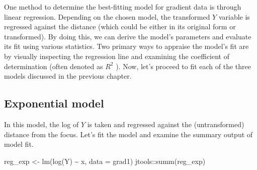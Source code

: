 \documentclass[
  letterpaper,
]{book}
\newenvironment{Shaded}{\begin{snugshade}}{\end{snugshade}}
\newcommand{\AttributeTok}[1]{\textcolor[rgb]{0.40,0.45,0.13}{#1}}
\newcommand{\FunctionTok}[1]{\textcolor[rgb]{0.28,0.35,0.67}{#1}}
\newcommand{\NormalTok}[1]{\textcolor[rgb]{0.00,0.23,0.31}{#1}}
\newcommand{\OtherTok}[1]{\textcolor[rgb]{0.00,0.23,0.31}{#1}}
\newcommand{\SpecialCharTok}[1]{\textcolor[rgb]{0.37,0.37,0.37}{#1}}
\begin{document}
One method to determine the best-fitting model for gradient data is
through linear regression. Depending on the chosen model, the
transformed \(Y\) variable is regressed against the distance (which
could be either in its original form or transformed). By doing this, we
can derive the model's parameters and evaluate its fit using various
statistics. Two primary ways to appraise the model's fit are by visually
inspecting the regression line and examining the coefficient of
determination (often denoted as \(R^2\) ). Now, let's proceed to fit
each of the three models discussed in the previous chapter.

\hypertarget{exponential-model-1}{%
\subsection{Exponential model}\label{exponential-model-1}}

In this model, the log of \(Y\) is taken and regressed against the
(untransformed) distance from the focus. Let's fit the model and examine
the summary output of model fit.

\begin{Shaded}
\begin{Highlighting}[]
\NormalTok{reg\_exp }\OtherTok{\textless{}{-}} \FunctionTok{lm}\NormalTok{(}\FunctionTok{log}\NormalTok{(Y) }\SpecialCharTok{\textasciitilde{}}\NormalTok{ x, }\AttributeTok{data =}\NormalTok{ grad1)}
\NormalTok{jtools}\SpecialCharTok{::}\FunctionTok{summ}\NormalTok{(reg\_exp)}
\end{Highlighting}
\end{Shaded}
\end{document}
